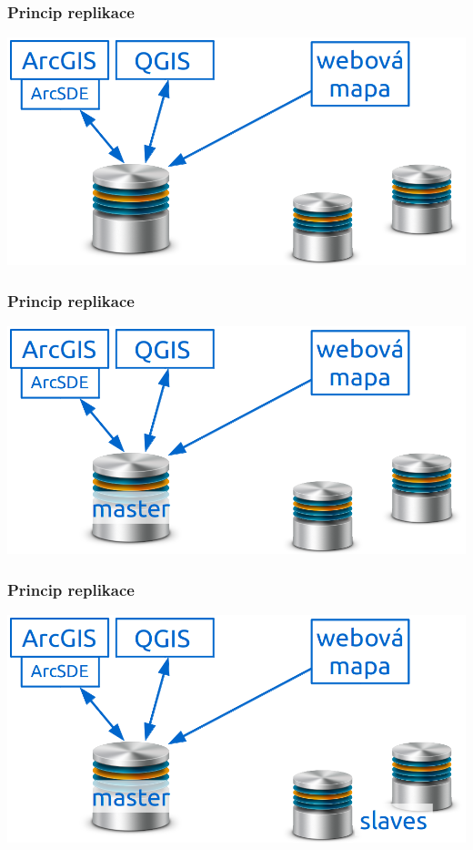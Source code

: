 \documentclass[xcolor=dvipsnames, 14pt]{beamer}
\begin{document}
  \begin{frame}
    \frametitle{Princip replikace}
    \centering
    \includegraphics[scale=0.45]{obr/schema5.png} 
  \end{frame}

  \begin{frame}
    \frametitle{Princip replikace}
    \centering
    \includegraphics[scale=0.45]{obr/schema6.png} 
  \end{frame}

  \begin{frame}
    \frametitle{Princip replikace}
    \centering
    \includegraphics[scale=0.45]{obr/schema7.png} 
  \end{frame}
\end{document}
